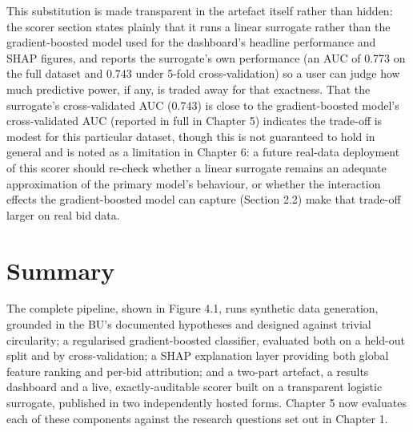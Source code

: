 This substitution is made transparent in the artefact itself rather than
hidden: the scorer section states plainly that it runs a linear
surrogate rather than the gradient-boosted model used for the
dashboard's headline performance and SHAP figures, and reports the
surrogate's own performance (an AUC of 0.773 on the full dataset and
0.743 under 5-fold cross-validation) so a user can judge how much
predictive power, if any, is traded away for that exactness. That the
surrogate's cross-validated AUC (0.743) is close to the gradient-boosted
model's cross-validated AUC (reported in full in Chapter 5) indicates
the trade-off is modest for this particular dataset, though this is not
guaranteed to hold in general and is noted as a limitation in Chapter 6:
a future real-data deployment of this scorer should re-check whether a
linear surrogate remains an adequate approximation of the primary
model's behaviour, or whether the interaction effects the
gradient-boosted model can capture (Section 2.2) make that trade-off
larger on real bid data.

\hypertarget{summary}{%
\section{Summary}\label{summary}}

The complete pipeline, shown in Figure 4.1, runs synthetic data
generation, grounded in the BU's documented hypotheses and designed
against trivial circularity; a regularised gradient-boosted classifier,
evaluated both on a held-out split and by cross-validation; a SHAP
explanation layer providing both global feature ranking and per-bid
attribution; and a two-part artefact, a results dashboard and a live,
exactly-auditable scorer built on a transparent logistic surrogate,
published in two independently hosted forms. Chapter 5 now evaluates
each of these components against the research questions set out in
Chapter 1.
